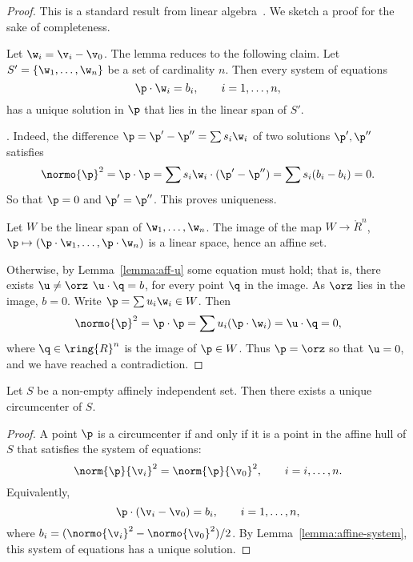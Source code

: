 \begin{proof} This is a standard result from linear algebra~\cite{XX}.
We sketch a proof for the sake of completeness.  

Let $\w_i = \v_i-\v_0$.  The lemma reduces to the following claim.
Let $S' = \{\w_1,\ldots,\w_n\}$ be a  set
of cardinality $n$.  Then every system of equations
\begin{displaymath}
\p \cdot \w_i = b_i,\qquad i=1,\ldots,n,
\end{displaymath}
has a unique solution in $\p$ that lies in the linear span of $S'$.

. Indeed, the difference 
$\p = \p'-\p'' = \sum s_i \w_i$ of two solutions
$\p',\p''$ satisfies
\begin{displaymath}
\normo{\p}^2=\p\cdot\p = \sum s_i \w_i \cdot (\p' - \p'') =
\sum s_i (b_i-b_i)= 0.
\end{displaymath}
So that $\p=0$ and $\p'=\p''$.  This proves uniqueness.

Let $W$ be the linear span of $\w_1,\ldots,\w_n$.  The image of the
map $W\to\ring{R}^n$, $\p\mapsto (\p\cdot\w_1,\ldots,\p\cdot\w_n)$ is
a linear space, hence an affine set.

Otherwise, by Lemma~\ref{lemma:aff-u} some equation must hold;
that is, there exists $\u\ne \orz$  $\u\cdot \q =b$, for every point $\q$ in the image.  
As $\orz$ lies in the image, $b=0$.  Write $\p = \sum u_i \w_i\in W$.
Then
\begin{displaymath}
\normo{\p}^2 = \p\cdot\p = \sum u_i (\p \cdot \w_i) = \u\cdot \q = 0,
\end{displaymath} 
where $\q\in\ring{R}^n$ is the image of $\p\in W$.
Thus $\p=\orz$ so that $\u=0$, and we have reached a contradiction.
\end{proof}

\begin{lemma} 
Let $S$ be a non-empty affinely independent set.  Then there exists a unique
circumcenter of $S$.
\end{lemma}

\begin{proof}
A point $\p$ is a circumcenter if and only if it is a point in the affine hull of $S$
that satisfies the system of equations:
\begin{displaymath}
\norm{\p}{\v_i}^2 = \norm{\p}{\v_0}^2,\qquad i = i,\ldots,n.
\end{displaymath}
Equivalently,
\begin{displaymath}
\p\cdot (\v_i-\v_0) = b_i,\qquad i=1,\ldots,n,
\end{displaymath}
where $b_i = (\normo{\v_i}^2-\normo{\v_0}^2)/2$.  By
Lemma~\ref{lemma:affine-system}, this system of equations has a unique
solution.
\end{proof}

